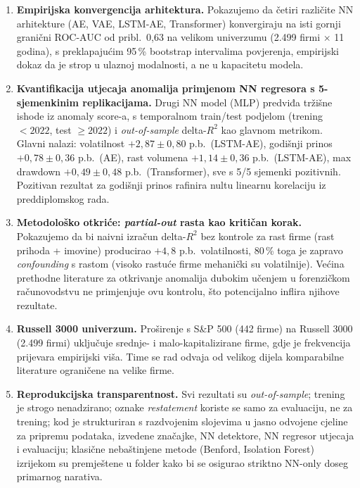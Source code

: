 \documentclass[diplomskirad,authoryear]{fer}
\begin{document}
\begin{enumerate}
 \item \textbf{Empirijska konvergencija arhitektura.} Pokazujemo da četiri različite NN arhitekture (AE, VAE, LSTM-AE, Transformer) konvergiraju na isti gornji granični ROC-AUC od pribl.\ 0,63 na velikom univerzumu (2.499 firmi $\times$ 11 godina), s preklapajućim 95\,\% bootstrap intervalima povjerenja, empirijski dokaz da je strop u ulaznoj modalnosti, a ne u kapacitetu modela.
 \item \textbf{Kvantifikacija utjecaja anomalija primjenom NN regresora s 5-sjemenkinim replikacijama.} Drugi NN model (MLP) predviđa tržišne ishode iz anomaly score-a, s temporalnom train/test podjelom (trening $<2022$, test $\geq 2022$) i \emph{out-of-sample} delta-$R^2$ kao glavnom metrikom. Glavni nalazi: volatilnost $+2{,}87 \pm 0{,}80$ p.b.\ (LSTM-AE), godišnji prinos $+0{,}78 \pm 0{,}36$ p.b.\ (AE), rast volumena $+1{,}14 \pm 0{,}36$ p.b.\ (LSTM-AE), max drawdown $+0{,}49 \pm 0{,}48$ p.b.\ (Transformer), sve s 5/5 sjemenki pozitivnih. Pozitivan rezultat za godišnji prinos rafinira nultu linearnu korelaciju iz preddiplomskog rada.
 \item \textbf{Metodološko otkriće: \emph{partial-out} rasta kao kritičan korak.} Pokazujemo da bi naivni izračun delta-$R^2$ bez kontrole za rast firme (rast prihoda + imovine) producirao $+4{,}8$ p.b.\ volatilnosti, 80\,\% toga je zapravo \emph{confounding} s rastom (visoko rastuće firme mehanički su volatilnije). Većina prethodne literature za otkrivanje anomalija dubokim učenjem u forenzičkom računovodstvu ne primjenjuje ovu kontrolu, što potencijalno inflira njihove rezultate.
 \item \textbf{Russell 3000 univerzum.} Proširenje s S\&P 500 (442 firme) na Russell 3000 (2.499 firmi) uključuje srednje- i malo-kapitalizirane firme, gdje je frekvencija prijevara empirijski viša. Time se rad odvaja od velikog dijela komparabilne literature ograničene na velike firme.
 \item \textbf{Reprodukcijska transparentnost.} Svi rezultati su \emph{out-of-sample}; trening je strogo nenadzirano; oznake \emph{restatement} koriste se samo za evaluaciju, ne za trening; kod je strukturiran s razdvojenim slojevima u jasno odvojene cjeline za pripremu podataka, izvedene značajke, NN detektore, NN regresor utjecaja i evaluaciju; klasične nebaštinjene metode (Benford, Isolation Forest) izrijekom su premještene u folder kako bi se osigurao striktno NN-only doseg primarnog narativa.
\end{enumerate}
\end{document}
